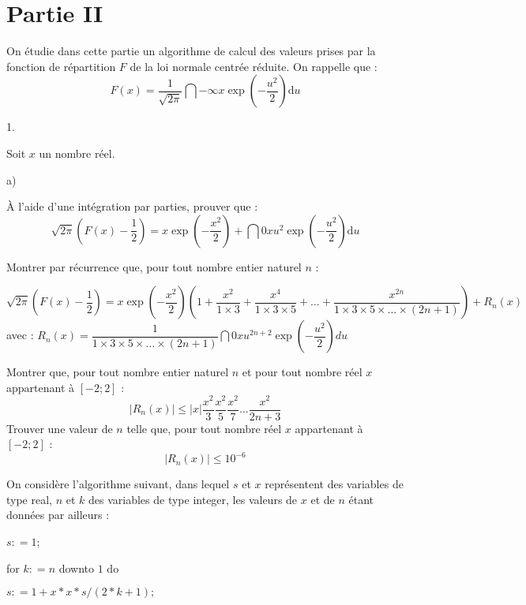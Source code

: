 \documentclass[11pt]{article}%
\begin{document}
\section*{Partie II}

On étudie dans cette partie un algorithme de calcul des valeurs prises
par
la fonction de répartition $F$ de la loi normale centrée réduite. On
rappelle que : 
\[
F(x) = \dfrac{1}{\sqrt{2\pi }}\dint{-\infty }{x}\exp \left(
-\dfrac{u^{2}}{2}\right) \text{d}u
\]

\begin{noliste}{1.}
 \setlength{\itemsep}{4mm}
\item Soit $x$ un nombre réel.

\begin{noliste}{a)}
 \setlength{\itemsep}{2mm}
\item À l'aide d'une intégration par parties, prouver que : 
\[
\sqrt{2\pi }\left( F(x)-\dfrac{1}{2}\right) = x\exp \left(
-\dfrac{x^{2}}{2}\right) + \dint{0}{x}u^{2}\exp \left(
-\dfrac{u^{2}}{2}\right) \text{d}u
\]

\item Montrer par récurrence que, pour tout nombre entier naturel $n$ :

\[
\sqrt{2\pi }\left( F(x)-\dfrac{1}{2}\right) = x\exp \left(
-\dfrac{x^{2}}{2}\right) \left( 1 + \dfrac{x^{2}}{1\times 3} +
\dfrac{x^{4}}{1\times 3\times 5} + \ldots + \dfrac{x^{2n}}{1\times
3\times 5\times \ldots \times (2n + 1)}\right)
 + R_{n}(x)
\]
avec : $R_{n}(x) = \dfrac{1}{1\times 3\times 5\times \ldots \times (2n
+ 1)}\dint{0}{x}u^{2n + 2}\exp \left( -\dfrac{u^{2}}{2}\right) du$
\end{noliste}

\item Montrer que, pour tout nombre entier naturel $n$ et pour tout
nombre
réel $x$ appartenant à $[-2 ; 2]$ : 
\[
\left|R_{n}(x)\right|\leq
|x|\dfrac{x^{2}}{3}\dfrac{x^{2}}{5}\dfrac{x^{2}}{7}\ldots
\dfrac{x^{2}}{2n + 3}
\]
Trouver une valeur de $n$ telle que, pour tout nombre réel $x$
appartenant
à $[-2 ; 2]$ : 
\[
\left|R_{n}(x)\right|\leq 10^{-6}
\]

\item On considère l'algorithme suivant, dans lequel $s$ et $x$
représentent des variables de type real, $n$ et $k$ des variables de
type
integer, les valeurs de $x$ et de $n$ étant données par ailleurs :

$s : = 1$;

for $k : = n$ downto $1$ do

$s : = 1 + x\ast x\ast s/(2\ast k + 1);$


\end{noliste}
\end{document}
